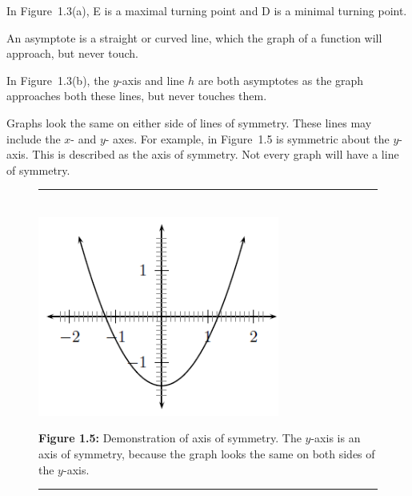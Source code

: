         \label{m39337*id236816}In Figure~1.3(a), E is a maximal turning point and D is a minimal turning point.\par 
      \label{m39337*uid49}
            \nopagebreak
        \label{m39337*id236837}An asymptote is a straight or curved line, which the graph of a function will approach, but never touch.\par 
        \label{m39337*id236844}In Figure~1.3(b), the $y$-axis and line $h$ are both asymptotes as the graph approaches both these lines, but never touches them.\par 
      \label{m39337*uid50}
            \nopagebreak
        \label{m39337*id236883}Graphs look the same on either side of lines of symmetry. These lines may include the $x$- and $y$- axes. For example, in Figure~1.5 is symmetric about the $y$-axis. This is described as the axis of symmetry. Not every graph will have a line of symmetry.\par 
    \setcounter{subfigure}{0}
	\begin{figure}[H] %
    \begin{center}
    \rule[.1in]{\figurerulewidth}{.005in} \\
        \label{m39337*uid51!!!underscore!!!media}\label{m39337*uid51!!!underscore!!!printimage}\includegraphics[width=300px]{col11306.imgs/m39337_MG10C11_036.png} %
      \vspace{2pt}
    \vspace{\rubberspace}\par \begin{cnxcaption}
	  \small \textbf{Figure 1.5: }Demonstration of axis of symmetry. The $y$-axis is an axis of symmetry, because the graph looks the same on both sides of the $y$-axis.
	\end{cnxcaption}
    \vspace{.1in}
    \rule[.1in]{\figurerulewidth}{.005in} \\
    \end{center}
 \end{figure}       
